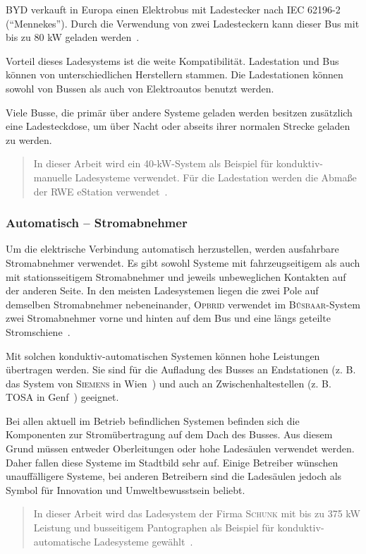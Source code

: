 \textsc{BYD} verkauft in Europa einen Elektrobus mit Ladestecker nach IEC 62196-2 ("`Mennekes"'). Durch die Verwendung von zwei Ladesteckern kann dieser Bus mit bis zu 80 kW geladen werden~\cite{bydSpecs4}.

Vorteil dieses Ladesystems ist die weite Kompatibilität. Ladestation und Bus können von unterschiedlichen Herstellern stammen. Die Ladestationen können sowohl von Bussen als auch von Elektroautos benutzt werden.

Viele Busse, die primär über andere Systeme geladen werden besitzen zusätzlich eine Ladesteckdose, um über Nacht oder abseits ihrer normalen Strecke geladen zu werden.

\begin{quotation}
	In dieser Arbeit wird ein 40-kW-System als Beispiel für konduktiv-manuelle Ladesysteme verwendet. Für die Ladestation werden die Abmaße der RWE eStation verwendet~\cite{rweKonMan}.
\end{quotation}

\subsubsection{Automatisch – Stromabnehmer}
Um die elektrische Verbindung automatisch herzustellen, werden ausfahrbare Stromabnehmer verwendet. Es gibt sowohl Systeme mit fahrzeugseitigem als auch mit stationsseitigem Stromabnehmer und jeweils unbeweglichen Kontakten auf der anderen Seite. In den meisten Ladesystemen liegen die zwei Pole auf demselben Stromabnehmer nebeneinander, \textsc{Opbrid} verwendet im \textsc{Bůsbaar}-System zwei Stromabnehmer vorne und hinten auf dem Bus und eine längs geteilte Stromschiene~\cite{SchKonLade}.

Mit solchen konduktiv-automatischen Systemen können hohe Leistungen übertragen werden. Sie sind für die Aufladung des Busses an Endstationen (z. B. das System von \textsc{Siemens} in Wien~\cite{SiemensWien}) und auch an Zwischenhaltestellen (z. B. \textsc{TOSA} in Genf~\cite{tosa}) geeignet. 

Bei allen aktuell im Betrieb befindlichen Systemen befinden sich die Komponenten zur Stromübertragung auf dem Dach des Busses. Aus diesem Grund müssen entweder Oberleitungen oder hohe Ladesäulen verwendet werden. Daher fallen diese Systeme im Stadtbild sehr auf. Einige Betreiber wünschen unauffälligere Systeme, bei anderen Betreibern sind die Ladesäulen jedoch als Symbol für Innovation und Umweltbewusstsein beliebt.

\begin{quotation}
	In dieser Arbeit wird das Ladesystem der Firma \textsc{Schunk} mit bis zu 375 kW Leistung und busseitigem Pantographen als Beispiel für konduktiv-automatische Ladesysteme gewählt~\cite{Weigel:2013}.
\end{quotation}

